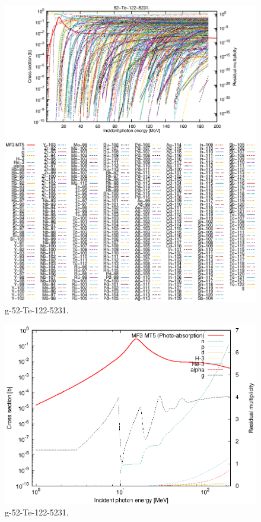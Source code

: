 \begin{figure}
 \includegraphics[width=\linewidth]{eps/g_52-Te-122_5231.eps}
  \caption{g-52-Te-122-5231.}
\end{figure}
\newpage \clearpage

\begin{figure}
 \includegraphics[width=\linewidth]{eps-log/g_52-Te-122_5231.eps}
 \caption{g-52-Te-122-5231.}
\end{figure}
\newpage \clearpage

